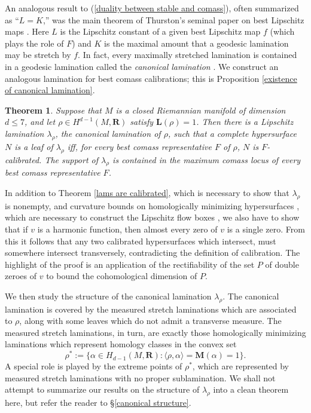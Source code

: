 \documentclass[reqno,11pt]{amsart}
\newcommand{\RR}{\mathbf{R}}
\newcommand{\Mass}{\mathbf M}
\newcommand{\Comass}{\mathbf L}
\newcommand{\dfn}[1]{\emph{#1}\index{#1}}
\newtheorem{mainthm}{Theorem}
\theoremstyle{definition}
\numberwithin{equation}{section}
\begin{document}
An analogous result to (\ref{duality between stable and comass}), often summarized as ``$L = K$,'' was the main theorem of Thurston's seminal paper on best Lipschitz maps \cite{Thurston98}.
Here $L$ is the Lipschitz constant of a given best Lipschitz map $f$ (which plays the role of $F$) and $K$ is the maximal amount that a geodesic lamination may be stretch by $f$.
In fact, every maximally stretched lamination is contained in a geodesic lamination called the \dfn{canonical lamination} \cite{Thurston98,Gu_ritaud_2017}.
We construct an analogous lamination for best comass calibrations; this is Proposition \ref{existence of canonical lamination}.

\begin{mainthm}\label{existence of calibrated lam}
Suppose that $M$ is a closed Riemannian manifold of dimension $d \leq 7$, and let $\rho \in H^{d - 1}(M, \RR)$ satisfy $\Comass(\rho) = 1$.
Then there is a Lipschitz lamination $\lambda_\rho$, the \dfn{canonical lamination} of $\rho$, such that a complete hypersurface $N$ is a leaf of $\lambda_\rho$ iff, for every best comass representative $F$ of $\rho$, $N$ is $F$-calibrated.
The support of $\lambda_\rho$ is contained in the maximum comass locus of every best comass representative $F$.
\end{mainthm}

In addition to Theorem \ref{lams are calibrated}, which is necessary to show that $\lambda_\rho$ is nonempty, and curvature bounds on homologically minimizing hypersurfaces \cite{Schoen75, Schoen81}, which are necessary to construct the Lipschitz flow boxes \cite{BackusCML}, we also have to show that if $v$ is a harmonic function, then almost every zero of $v$ is a single zero.
From this it follows that any two calibrated hypersurfaces which intersect, must somewhere intersect transversely, contradicting the definition of calibration.
The highlight of the proof is an application of the rectifiability of the set $P$ of double zeroes of $v$ \cite{Hardt89} to bound the cohomological dimension of $P$.

We then study the structure of the canonical lamination $\lambda_\rho$.
The canonical lamination is covered by the measured stretch laminations which are associated to $\rho$, along with some leaves which do not admit a transverse measure.
The measured stretch laminations, in turn, are exactly those homologically minimizing laminations which represent homology classes in the convex set 
$$\rho^* := \{\alpha \in H_{d - 1}(M, \RR): \langle \rho, \alpha\rangle = \Mass(\alpha) = 1\}.$$
A special role is played by the extreme points of $\rho^*$, which are represented by measured stretch laminations with no proper sublamination.
We shall not attempt to summarize our results on the structure of $\lambda_\rho$ into a clean theorem here, but refer the reader to \S\ref{canonical structure}.
\end{document}
